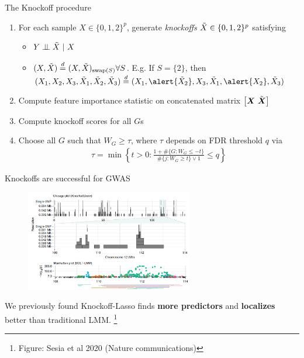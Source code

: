 \documentclass[aspectratio=169, 10pt]{beamer}
\newcommand{\bX}{\boldsymbol{X}}
\newcommand{\indep}{\perp \!\!\! \perp}
\newcommand\blfootnote[1]{%
\begingroup
\renewcommand\thefootnote{}\footnote{#1}%
\addtocounter{footnote}{-1}%
\endgroup
}
\begin{document}
\begin{frame}{The Knockoff procedure}
\begin{enumerate}
    \item For each sample $X \in \{0, 1, 2\}^p$, generate \textit{knockoffs} $\Tilde{X}\in\{0, 1, 2\}^{p}$ satisfying 
    \begin{itemize}
        \item $Y \indep \Tilde{X} \ | \ X$
        \item $(X, \Tilde{X}) \stackrel{d}{=} (X, \Tilde{X})_{\text{swap}(S)} \forall S$. E.g. If $S=\{2\}$, then $(X_1, X_2, X_3, \Tilde{X}_1, \Tilde{X}_2, \Tilde{X}_3) \stackrel{d}{=} (X_1, \alert{\tilde{X}_2}, X_3, \Tilde{X}_1, \alert{X_2}, \Tilde{X}_3)$
    \end{itemize}
    \item Compute feature importance statistic on concatenated matrix $\left[\bX \ \Tilde{\bX}\right]$
    \item Compute knockoff scores  for all $G$s
    \item Choose all $G$ such that $W_G \ge \tau$, where $\tau$ depends on FDR threshold $q$ via 
    \begin{align*}
        \tau = \min \left\{t > 0 : \frac{1 + \#\{G: W_G \le -t\}}{\#\{j: W_G \ge t\} \vee 1} \le q\right\}
    \end{align*}
\end{enumerate}
\end{frame}

\begin{frame}{Knockoffs are successful for GWAS}
\begin{figure}
    \centering
    \includegraphics[width=0.65\textwidth]{figures/knockoffzoom.png}
\end{figure}
We previously found Knockoff-Lasso finds \textbf{more predictors} and \textbf{localizes} better than traditional LMM. 
\blfootnote{Figure: Sesia et al 2020 (Nature communications)}
\end{frame}
\end{document}
